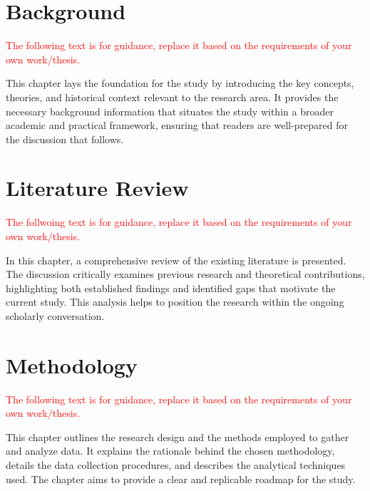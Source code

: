 \documentclass{uethesis}
\begin{document}
\chapter{Background} \label{chap:background}
\textcolor{red}{The following text is for guidance, replace it based on the requirements of your own work/thesis.}

This chapter lays the foundation for the study by introducing the key concepts, theories, and historical context relevant to the research area. It provides the necessary background information that situates the study within a broader academic and practical framework, ensuring that readers are well-prepared for the discussion that follows.

\chapter{Literature Review}\label{chap:lit}
\textcolor{red}{The follwoing text is for guidance, replace it based on the requirements of your own work/thesis.}

In this chapter, a comprehensive review of the existing literature is presented. The discussion critically examines previous research and theoretical contributions, highlighting both established findings and identified gaps that motivate the current study. This analysis helps to position the research within the ongoing scholarly conversation.


\chapter{Methodology} \label{chap:method}
\textcolor{red}{The following text is for guidance, replace it based on the requirements of your own work/thesis.}

This chapter outlines the research design and the methods employed to gather and analyze data. It explains the rationale behind the chosen methodology, details the data collection procedures, and describes the analytical techniques used. The chapter aims to provide a clear and replicable roadmap for the study.



\end{document}

